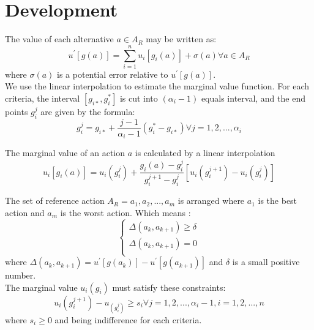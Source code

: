 \documentclass{report}
\begin{document}
\section{Development}
The value of each alternative $a \in A_R $ may be written as:
\begin{equation}
	u^{'} [g(a)] = \sum_{i=1}^{n} u_i [g_i (a)] + \sigma (a)   \forall a \in A_R
\end{equation}
where $\sigma (a)$ is a potential error relative to $u^{'} [g(a)]$.\\

We use the linear interpolation to estimate the marginal value function. For each criteria, the interval $[g_{i*}, g_i^{*}]$ is cut into $(\alpha _i -1)$ equals interval, and the end points $g_i^{j}$ are given by the formula:
\begin{equation}
	g_i^{j}= g_{i*} + \frac{j-1}{\alpha _i -1} (g_i^{*} - g_{i*})  \forall j = 1,2, ..., \alpha _i
\end{equation}

The marginal value of an action $a$ is calculated by a linear interpolation
\begin{equation}
	u_i [g_i (a)] = u_i (g_i^{j}) + \frac{g_i (a) - g_i^{j}}{ g_i^{j+1} - g_i^{j}} [u_i (g_i^{j+1}) - u_i (g_i^{j}) ] 
\end{equation}

The set of reference action $ A_R = a_1, a_2, ... , a_m$ is arranged where $a_1$ is the best action and $a_m$ is the worst action. Which means : 
\begin{equation}\label{eq3}
      \begin{cases}
      	\Delta (a_k, a_{k+1} ) \geq \delta\\
       	\Delta (a_k, a_{k+1} ) = 0 \\
      \end{cases}
\end{equation}
where $\Delta (a_k, a_{k+1} ) = u^{'} [g(a_k)] - u^{'} [g(a_{k+1})]$ and $\delta$ is a small positive number. \\

The marginal value $u_i (g_i)$ must satisfy these constraints: 
\begin{equation}\label{eq4}
	u_i (g_i^{j+1}) - u_(g_i^{j}) \geq s_i \forall j = 1,2, ..., \alpha _i  - 1, i = 1,2, ..., n 
\end{equation}
where $s_i \geq 0$ and being indifference for each criteria.  \\
\end{document}
